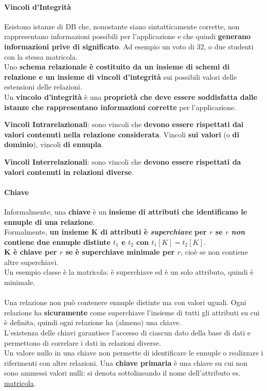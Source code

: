 \documentclass[10pt]{book}
\begin{document}
\paragraph{Vincoli d'Integrità} Esistono istanze di DB che, nonostante siano sintatticamente corrette, non rappresentano informazioni possibili per l'applicazione e che quindi \textbf{generano informazioni prive di significato}. Ad esempio un voto di 32, o due studenti con la stessa matricola.\\
Uno \textbf{schema relazionale è costituito da un insieme di schemi di relazione e un insieme di vincoli d'integrità} sui possibili valori delle estensioni delle relazioni.\\
Un \textbf{vincolo d'integrità} è una \textbf{proprietà che deve essere soddisfatta dalle istanze che rappresentano informazioni corrette} per l'applicazione.
\pagebreak
\begin{list}{}{}
	\item \textbf{Vincoli Intrarelazionali}: sono vincoli che \textbf{devono essere rispettati dai valori contenuti nella relazione considerata}. Vincoli \textbf{sui valori} (o \textbf{di dominio}), vincoli \textbf{di ennupla}.
	\item \textbf{Vincoli Interrelazionali}: sono vincoli che \textbf{devono essere rispettati da valori contenuti in relazioni diverse}.
\end{list}
\paragraph{Chiave} Informalmente, una \textbf{chiave} è un \textbf{insieme di attributi che identificano le ennuple di una relazione}.\\
Formalmente, \textbf{un insieme K di attributi è \textit{superchiave} per $r$ se $r$ \textit{non} contiene due ennuple distinte $t_1$ e $t_2$ con $t_1[K] = t_2[K]$}.\\
\textbf{K è chiave per $r$ se è superchiave minimale per $r$}, cioè se non contiene altre superchiavi.\\
Un esempio classe è la matricola: è superchiave ed è un solo attributo, quindi è minimale.\\\\
Una relazione non può contenere ennuple distinte ma con valori uguali. Ogni relazione ha \textbf{sicuramente} come superchiave l'insieme di tutti gli attributi su cui è definita, quindi ogni relazione ha (almeno) una chiave.\\
L'esistenza delle chiavi garantisce l'accesso di ciascun dato della base di dati e permettono di correlare i dati in relazioni diverse.\\
Un valore nullo in una chiave non permette di identificare le ennuple o realizzare i riferimenti con altre relazioni. Una \textbf{chiave primaria} è una chiave su cui non sono ammessi valori nulli: si denota sottolineando il nome dell'attributo es. \underline{matricola}.
\end{document}
